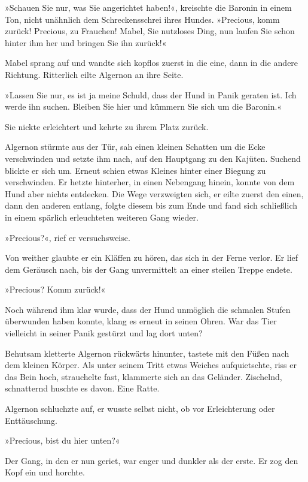 »Schauen Sie nur, was Sie angerichtet haben!«, kreischte die
Baronin in einem Ton, nicht unähnlich dem Schreckensschrei ihres
Hundes. »Precious, komm zurück! Precious, zu Frauchen! Mabel, Sie
nutzloses Ding, nun laufen Sie schon hinter ihm her und bringen Sie
ihn zurück!«

Mabel sprang auf und wandte sich kopflos zuerst in die eine, dann
in die andere Richtung. Ritterlich eilte Algernon an ihre Seite.

»Lassen Sie nur, es ist ja meine Schuld, dass der Hund in Panik
geraten ist. Ich werde ihn suchen. Bleiben Sie hier und kümmern Sie
sich um die Baronin.«

Sie nickte erleichtert und kehrte zu ihrem Platz zurück.

\bigpar

Algernon stürmte aus der Tür, sah einen kleinen Schatten um die
Ecke verschwinden und setzte ihm nach, auf den Hauptgang zu den
Kajüten. Suchend blickte er sich um. Erneut schien etwas Kleines
hinter einer Biegung zu verschwinden. Er hetzte hinterher, in einen
Nebengang hinein, konnte von dem Hund aber nichts entdecken. Die
Wege verzweigten sich, er eilte zuerst den einen, dann den anderen
entlang, folgte diesem bis zum Ende und fand sich schließlich in
einem spärlich erleuchteten weiteren Gang wieder.

\bigpar

»Precious?«, rief er versuchsweise.

Von weither glaubte er ein Kläffen zu hören, das sich in der Ferne
verlor. Er lief dem Geräusch nach, bis der Gang unvermittelt an
einer steilen Treppe endete.

»Precious? Komm zurück!«

Noch während ihm klar wurde, dass der Hund unmöglich die schmalen
Stufen überwunden haben konnte, klang es erneut in seinen Ohren.
War das Tier vielleicht in seiner Panik gestürzt und lag dort
unten?

Behutsam kletterte Algernon rückwärts hinunter, tastete mit den
Füßen nach dem kleinen Körper. Als unter seinem Tritt etwas Weiches
aufquietschte, riss er das Bein hoch, strauchelte fast, klammerte
sich an das Geländer. Zischelnd, schnatternd huschte es davon. Eine
Ratte.

Algernon schluchzte auf, er wusste selbst nicht, ob vor
Erleichterung oder Enttäuschung.

»Precious, bist du hier unten?«

Der Gang, in den er nun geriet, war enger und dunkler als der
erste. Er zog den Kopf ein und horchte.

